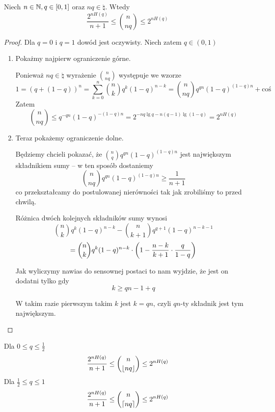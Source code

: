 \begin{theorem}[Lemat 10.2 P\&C]
    \label{entropy-binomial-coefficients-base}
    Niech \( n \in \mathbb{N}, q \in \left[0, 1\right] \) oraz \( nq \in \natural \). Wtedy
    \[
        \frac{2^{nH(q)}}{n + 1} \leq \binom{n}{nq} \leq 2^{nH(q)}
    \]
\end{theorem}
\begin{proof}
    Dla \( q = 0 \) i \( q = 1 \) dowód jest oczywisty. Niech zatem \( q \in (0, 1) \)
    \begin{enumerate}
        \item Pokażmy najpierw ograniczenie górne.
        
        Ponieważ \( nq \in \natural \) wyrażenie \( \binom{n}{nq} \) występuje we wzorze
        \[
            1 = (q + (1-q))^n = \sum_{k=0}^n \binom{n}{k} q^k(1-q)^{n-k} = \binom{n}{nq}
            q^{qn}(1-q)^{(1-q)n} + \text{coś}
        \]
        Zatem 
        \[
            \binom{n}{nq} \leq q^{-qn}(1-q)^{-(1-q)n} = 2^{-nq\lg q - n(q-1)\lg(1-q)} = 2^{nH(q)}
        \]
        
        \item Teraz pokażemy ograniczenie dolne. 
        
        Będziemy chcieli pokazać, że \( \binom{n}{q}q^{qn}(1-q)^{(1-q)n} \) 
        jest największym składnikiem sumy -- w ten sposób dostaniemy
        \[
            \binom{n}{nq}q^{qn}(1-q)^{(1-q)n} \geq \frac{1}{n+1}
        \]
        co przekształcamy do postulowanej nierówności tak jak zrobiliśmy to przed chwilą.
        
        Różnica dwóch kolejnych składników sumy wynosi
        \[
            \binom{n}{k}q^k(1-q)^{n-k} - \binom{n}{k+1}q^{q+1}(1-q)^{n-k-1}
        \]
        \[
            = \binom{n}{k}q^k(1-q)^{n-k} \cdot \left(1 - \frac{n - k}{k + 1} \cdot \frac{q}{1-q}\right)
        \]
        
        Jak wyliczymy nawias do sensownej postaci to nam wyjdzie, że jest on dodatni tylko gdy 
        \[
            k \geq qn - 1 + q
        \]
        
        W takim razie pierwszym takim \( k \) jest \( k = qn \), czyli \( qn\)-ty składnik jest tym największym.
    \end{enumerate}
\end{proof}
\begin{theorem}[Wniosek 10.3 P\&C] \( \) \\
   Dla \( 0 \leq q \leq \frac{1}{2} \)
    \[
        \frac{2^{nH(q)}}{n + 1} \leq \binom{n}{\left\lfloor nq\right\rfloor} \leq 2^{nH(q)} 
    \]
    Dla \( \frac{1}{2} \leq q \leq 1 \)
    \[
        \frac{2^{nH(q)}}{n + 1} \leq \binom{n}{\left\lceil nq\right\rceil} \leq 2^{nH(q)} \\
    \]
\end{theorem}
